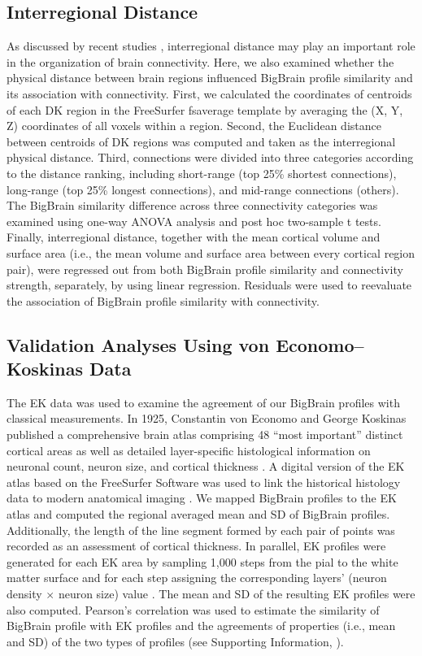 \begin{refsection}
\subsection*{Interregional Distance}
As discussed by recent studies \citep{beul2017predictive,beul2015predictive}, interregional distance may play an important role in the organization of brain connectivity. Here, we also examined whether the physical distance between brain regions influenced BigBrain profile similarity and its association with connectivity. First, we calculated the coordinates of centroids of each DK region in the FreeSurfer fsaverage template by averaging the (X, Y, Z) coordinates of all voxels within a region. Second, the Euclidean distance between centroids of DK regions was computed and taken as the interregional physical distance. Third, connections were divided into three categories according to the distance ranking, including short-range (top 25\% shortest connections), long-range (top 25\% longest connections), and mid-range connections (others). The BigBrain similarity difference across three connectivity categories was examined using one-way ANOVA analysis and post hoc two-sample t tests. Finally, interregional distance, together with the mean cortical volume and surface area (i.e., the mean volume and surface area between every cortical region pair), were regressed out from both BigBrain profile similarity and connectivity strength, separately, by using linear regression. Residuals were used to reevaluate the association of BigBrain profile similarity with connectivity.

\subsection*{Validation Analyses Using von Economo–Koskinas Data}
The EK data was used to examine the agreement of our BigBrain profiles with classical measurements. In 1925, Constantin von Economo and George Koskinas published a comprehensive brain atlas comprising 48 “most important” distinct cortical areas as well as detailed layer-specific histological information on neuronal count, neuron size, and cortical thickness \citep{von1925cytoarchitektonik}. A digital version of the EK atlas based on the FreeSurfer Software \citep{FISCHL2012Freesurfer} was used to link the historical histology data to modern anatomical imaging \citep{SCHOLTENS2018ECONOMO,Scholtens2015ECONOMO}. We mapped BigBrain profiles to the EK atlas and computed the regional averaged mean and SD of BigBrain profiles. Additionally, the length of the line segment formed by each pair of points was recorded as an assessment of cortical thickness. In parallel, EK profiles were generated for each EK area by sampling 1,000 steps from the pial to the white matter surface and for each step assigning the corresponding layers’ (neuron density $\times$ neuron size) value \citep{von1925cytoarchitektonik}. The mean and SD of the resulting EK profiles were also computed. Pearson’s correlation was used to estimate the similarity of BigBrain profile with EK profiles and the agreements of properties (i.e., mean and SD) of the two types of profiles (see Supporting Information, \citet{WEI2019bigbrain}).


\end{refsection}
